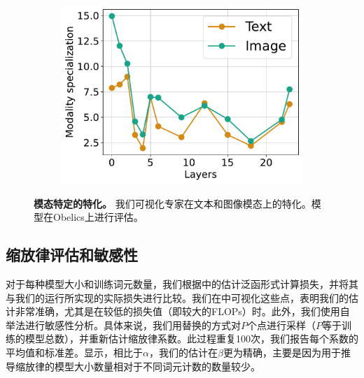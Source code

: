 \begin{figure}
        \vspace{-4mm}
        \centering
        \captionsetup{type=figure}
        \begin{subfigure}[t]{\linewidth}
            \includegraphics[width=1.0\textwidth]{assets/moes/specialization/model1088/modality_specialization_1088_150_across_layers.pdf}
        \end{subfigure}
        
        \caption{\textbf{模态特定的特化。} 我们可视化专家在文本和图像模态上的特化。模型在Obelics上进行评估。}
        \label{fig:app_moes_specialization}
\end{figure}   



\subsection{缩放律评估和敏感性}

对于每种模型大小和训练词元数量，我们根据中的估计泛函形式计算损失，并将其与我们的运行所实现的实际损失进行比较。我们在中可视化这些点，表明我们的估计非常准确，尤其是在较低的损失值（即较大的FLOPs）时。此外，我们使用自举法进行敏感性分析。具体来说，我们用替换的方式对\( P \)个点进行采样（\( P \)等于训练的模型总数），并重新估计缩放律系数。此过程重复100次，我们报告每个系数的平均值和标准差。显示，相比于\(\alpha\)，我们的估计在\(\beta\)更为精确，主要是因为用于推导缩放律的模型大小数量相对于不同词元计数的数量较少。  





